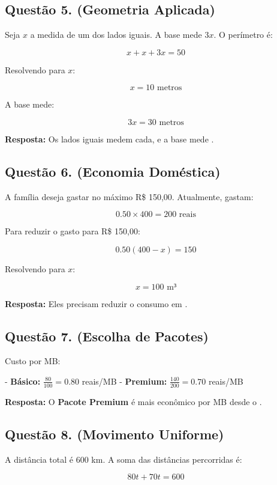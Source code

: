 \documentclass[11pt]{article}
\begin{document}
\begin{multicols}{2}
\subsection*{Questão 5. (Geometria Aplicada)}
Seja \(x\) a medida de um dos lados iguais. A base mede \(3x\). O perímetro é:

\[
x + x + 3x = 50
\]

Resolvendo para \(x\):

\[
x = 10 \text{ metros}
\]

A base mede:

\[
3x = 30 \text{ metros}
\]

\textbf{Resposta:} Os lados iguais medem  cada, e a base mede .



\subsection*{Questão 6. (Economia Doméstica)}
A família deseja gastar no máximo R\$ 150,00. Atualmente, gastam:

\[
0.50 \times 400 = 200 \text{ reais}
\]

Para reduzir o gasto para R\$ 150,00:

\[
0.50(400 - x) = 150
\]

Resolvendo para \(x\):

\[
x = 100 \text{ m³}
\]

\textbf{Resposta:} Eles precisam reduzir o consumo em .



\subsection*{Questão 7. (Escolha de Pacotes)}
Custo por MB:

- \textbf{Básico:} \(\frac{80}{100} = 0.80\) reais/MB
- \textbf{Premium:} \(\frac{140}{200} = 0.70\) reais/MB

\textbf{Resposta:} O \textbf{Pacote Premium} é mais econômico por MB desde o .



\subsection*{Questão 8. (Movimento Uniforme)}
A distância total é 600 km. A soma das distâncias percorridas é:

\[
80t + 70t = 600
\]


\end{multicols}
\end{document}
